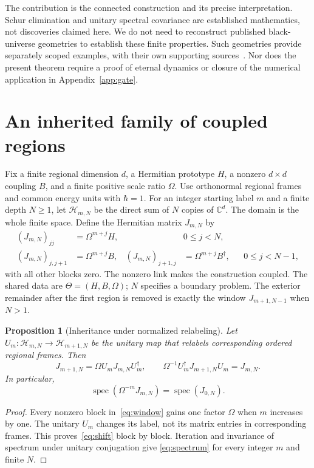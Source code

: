 \documentclass[11pt]{article}
\newcommand{\spec}{\operatorname{spec}}
\newtheorem{proposition}{Proposition}
\begin{document}
The contribution is the connected construction and its precise interpretation.
Schur elimination and unitary spectral covariance are established mathematics,
not discoveries claimed here. We do not need to reconstruct published
black-universe geometries to establish these finite properties. Such
geometries provide separately scoped examples, with their own supporting
sources~\cite{BronnikovDehnenMelnikov2007}. Nor does the present theorem
require a proof of eternal dynamics or closure of the numerical application
in Appendix~\ref{app:gate}.

\section{An inherited family of coupled regions}
Fix a finite regional dimension $d$, a Hermitian prototype $H$, a nonzero
$d\times d$ coupling $B$, and a finite positive scale ratio $\Omega$.
Use orthonormal regional frames and common energy units with $\hbar=1$.
For an integer starting label $m$ and a finite depth $N\geq1$, let
$\mathcal H_{m,N}$ be the direct sum of $N$ copies of $\mathbb C^d$.
The domain is the whole finite space. Define the Hermitian matrix $J_{m,N}$ by
\begin{align}\label{eq:window}
 (J_{m,N})_{jj}&=\Omega^{m+j}H, &&0\leq j<N,\\
 (J_{m,N})_{j,j+1}&=\Omega^{m+j}B,
 & (J_{m,N})_{j+1,j}&=\Omega^{m+j}B^\dagger, &&0\leq j<N-1,
\end{align}
with all other blocks zero. The nonzero link makes the construction coupled.
The shared data are $\Theta=(H,B,\Omega)$; $N$ specifies a boundary problem.
The exterior remainder after the first region is removed is exactly the
window $J_{m+1,N-1}$ when $N>1$.

\begin{proposition}[Inheritance under normalized relabeling]\label{prop:inherit}
Let $U_m:\mathcal H_{m,N}\to\mathcal H_{m+1,N}$ be the unitary map that
relabels corresponding ordered regional frames. Then
\begin{equation}\label{eq:shift}
 J_{m+1,N}=\Omega U_mJ_{m,N}U_m^\dagger,
 \qquad \Omega^{-1}U_m^\dagger J_{m+1,N}U_m=J_{m,N}.
\end{equation}
In particular,
\begin{equation}\label{eq:spectrum}
 \spec\!\left(\Omega^{-m}J_{m,N}\right)=\spec(J_{0,N}).
\end{equation}
\end{proposition}
\begin{proof}
Every nonzero block in~\eqref{eq:window} gains one factor $\Omega$ when
$m$ increases by one. The unitary $U_m$ changes its label, not its matrix
entries in corresponding frames. This proves~\eqref{eq:shift} block by
block. Iteration and invariance of spectrum under unitary conjugation give
\eqref{eq:spectrum} for every integer $m$ and finite $N$.
\end{proof}
\end{document}
